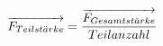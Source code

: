 \documentclass[preview]{standalone}
\begin{document}
\begin{align*}
\special{dvisvgm:raw <g id='unique000'>}\overrightarrow{F_{Teilst \ddot{a} rke}} = \frac{\overrightarrow{F_{Gesamtst \ddot{a} rke}}} {Teilanzahl}\special{dvisvgm:raw </g>}
\end{align*}
\end{document}
